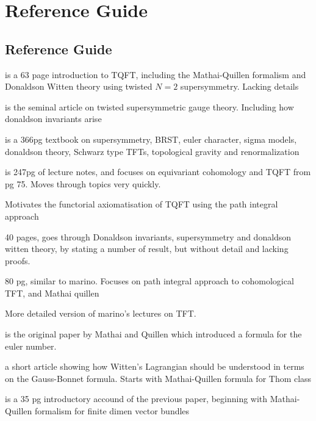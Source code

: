 
\chapter{Reference Guide}
\label{appendix1}

\section{Reference Guide}
\cite{cernTQFT} is a 63 page introduction to TQFT, including the Mathai-Quillen
formalism and Donaldson Witten theory using twisted $N=2$ supersymmetry.
Lacking details

\cite{wittenTQFT} is the seminal article on twisted supersymmetric gauge theory.
Including how donaldson invariants arise

\cite{birminghamTFT} is a 366pg textbook on supersymmetry, BRST, euler
character, sigma models, donaldson theory, Schwarz type TFTs, topological
gravity and renormalization

\cite{cordes95} is 247pg of lecture notes, and focuses on equivariant cohomology
and TQFT from pg 75. Moves through topics very quickly.

\cite{axiomTQFTintro} Motivates the functorial axiomatisation of TQFT using the
path integral approach

\cite{marino} 40 pages, goes through Donaldson invariants, supersymmetry and donaldson
witten theory, by stating a number of result, but without detail and lacking
proofs. 

\cite{moore} 80 pg, similar to marino. Focuses on path integral approach to
cohomological TFT, and Mathai quillen

\cite{TQFTbook} More detailed version of marino's lectures on TFT. 

\cite{MQformula} is the original paper by Mathai and Quillen which introduced a
formula for the euler number.

\cite{atiyahlagrangians} a short article showing how Witten's Lagrangian should
be understood in terms on the Gauss-Bonnet formula. Starts with Mathai-Quillen
formula for Thom class

\cite{MQintro} is a 35 pg introductory accound of the previous paper, beginning
with Mathai-Quillen formalism for finite dimen vector bundles




